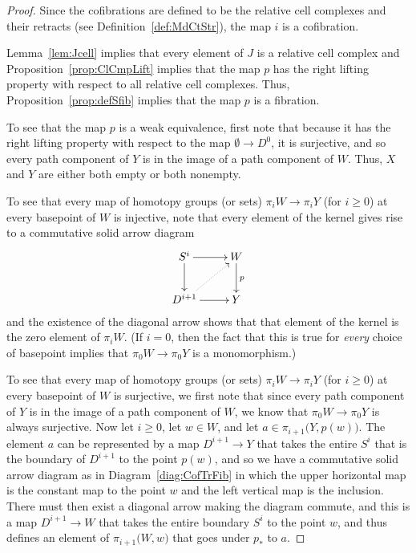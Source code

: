 \documentclass{amsart}
\numberwithin{equation}{section}
\theoremstyle{slplain}
\theoremstyle{definition}
\theoremstyle{remark}
\newcommand{\propref}{Proposition~\ref}
\newcommand{\lemref}{Lemma~\ref}
\newcommand{\defref}{Definition~\ref}
\newcommand{\diagref}{Diagram~\ref}
\begin{document}
\begin{proof}
  Since the cofibrations are defined to be the relative cell complexes
  and their retracts (see \defref{def:MdCtStr}), the map $i$ is a
  cofibration.

  \lemref{lem:Jcell} implies that every element of $J$ is a relative
  cell complex and \propref{prop:ClCmpLift} implies that the map $p$
  has the right lifting property with respect to all relative cell
  complexes.  Thus, \propref{prop:defSfib} implies that the map $p$ is
  a fibration.

  To see that the map $p$ is a weak equivalence, first note that
  because it has the right lifting property with respect to the map
  $\emptyset \to D^{0}$, it is surjective, and so every path component
  of $Y$ is in the image of a path component of $W$.  Thus, $X$ and
  $Y$ are either both empty or both nonempty.

  To see that every map of homotopy groups (or sets) $\pi_{i}W \to
  \pi_{i}Y$ (for $i \ge 0$) at every basepoint of $W$ is injective,
  note that every element of the kernel gives rise to a commutative
  solid arrow diagram
  \begin{equation}
    \label{diag:CofTrFib}
    \vcenter{
      \xymatrix{
        {S^{i}} \ar[r] \ar[d]
        & {W} \ar[d]^{p}\\
        {D^{i+1}} \ar[r] \ar@{..>}[ur]
        & {Y}
      }%
    }%
  \end{equation}
  and the existence of the diagonal arrow shows that that element of
  the kernel is the zero element of $\pi_{i}W$.  (If $i = 0$, then the
  fact that this is true for \emph{every} choice of basepoint implies
  that $\pi_{0}W \to \pi_{0}Y$ is a monomorphism.)

  To see that every map of homotopy groups (or sets) $\pi_{i}W \to
  \pi_{i}Y$ (for $i \ge 0$) at every basepoint of $W$ is surjective,
  we first note that since every path component of $Y$ is in the image
  of a path component of $W$, we know that $\pi_{0}W \to \pi_{0}Y$ is
  always surjective.  Now let $i \ge 0$, let $w \in W$, and let $a \in
  \pi_{i+1}\bigl(Y, p(w)\bigr)$.  The element $a$ can be represented
  by a map $D^{i+1} \to Y$ that takes the entire $S^{i}$ that is the
  boundary of $D^{i+1}$ to the point $p(w)$, and so we have a
  commutative solid arrow diagram as in \diagref{diag:CofTrFib} in
  which the upper horizontal map is the constant map to the point $w$
  and the left vertical map is the inclusion.  There must then exist a
  diagonal arrow making the diagram commute, and this is a map
  $D^{i+1} \to W$ that takes the entire boundary $S^{i}$ to the point
  $w$, and thus defines an element of $\pi_{i+1}\bigl(W,w\bigr)$ that
  goes under $p_{*}$ to $a$.
\end{proof}
\end{document}
